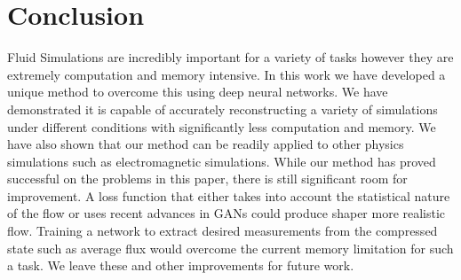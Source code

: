\documentclass{article}
\begin{document}
\section{Conclusion}

Fluid Simulations are incredibly important for a variety of tasks however they are extremely computation and memory intensive. In this work we have developed a unique method to overcome this using deep neural networks. We have demonstrated it is capable of accurately reconstructing a variety of simulations under different conditions with significantly less computation and memory. We have also shown that our method can be readily applied to other physics simulations such as electromagnetic simulations. While our method has proved successful on the problems in this paper, there is still significant room for improvement. A loss function that either takes into account the statistical nature of the flow or uses recent advances in GANs could produce shaper more realistic flow. Training a network to extract desired measurements from the compressed state such as average flux would overcome the current memory limitation for such a task. We leave these and other improvements for future work.



\end{document}
